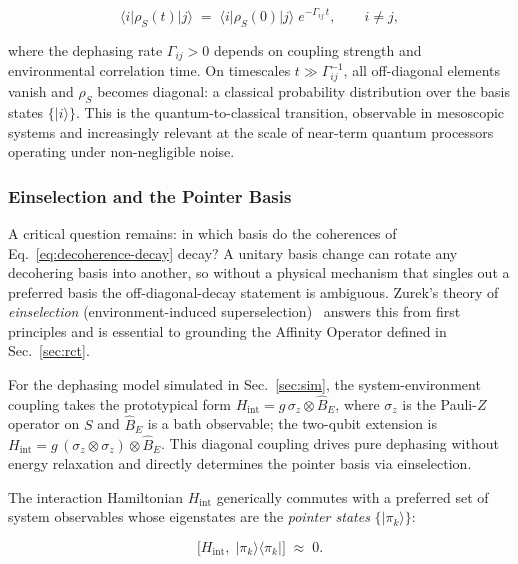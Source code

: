\begin{equation}
\label{eq:decoherence-decay}
\langle i \vert \rho_S(t) \vert j \rangle
  \;=\;
  \langle i \vert \rho_S(0) \vert j \rangle\;
  e^{-\Gamma_{ij}\, t},
  \qquad i \neq j,
\end{equation}

\noindent
where the dephasing rate $\Gamma_{ij} > 0$ depends on coupling
strength and environmental correlation time.
On timescales $t \gg \Gamma_{ij}^{-1}$, all off-diagonal elements
vanish and $\rho_S$ becomes diagonal: a classical probability distribution over the basis states $\{\vert i\rangle\}$.
This is the quantum-to-classical transition, observable in mesoscopic
systems and increasingly relevant at the scale of near-term quantum
processors operating under non-negligible noise.

\subsubsection*{Einselection and the Pointer Basis}

A critical question remains: in which basis do the coherences of
Eq.~\eqref{eq:decoherence-decay} decay?
A unitary basis change can rotate any decohering basis into another, so
without a physical mechanism that singles out a preferred basis the
off-diagonal-decay statement is ambiguous.
Zurek's theory of \emph{einselection} (environment-induced
superselection)~\cite{Zurek2003} answers this from first principles
and is essential to grounding the Affinity Operator defined in
Sec.~\ref{sec:rct}.

For the dephasing model simulated in Sec.~\ref{sec:sim}, the
system-environment coupling takes the prototypical form
$H_{\mathrm{int}} = g\,\sigma_z \otimes \hat{B}_E$,
where $\sigma_z$ is the Pauli-$Z$ operator on $S$ and
$\hat{B}_E$ is a bath observable; the two-qubit extension is
$H_{\mathrm{int}} = g\,(\sigma_z \otimes \sigma_z) \otimes \hat{B}_E$.
This diagonal coupling drives pure dephasing without energy relaxation
and directly determines the pointer basis via einselection.

The interaction Hamiltonian $H_{\mathrm{int}}$ generically commutes
with a preferred set of system observables whose eigenstates are
the \emph{pointer states} $\{\vert \pi_k \rangle\}$:

\begin{equation}
\label{eq:pointer}
\bigl[ H_{\mathrm{int}},\;
       \vert \pi_k \rangle\langle \pi_k \vert \bigr]
\;\approx\; 0.
\end{equation}

